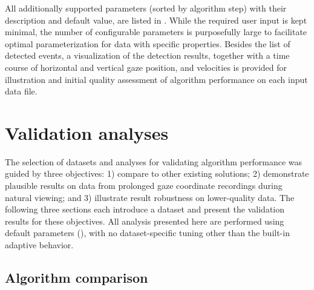 All additionally supported parameters (sorted by algorithm step) with their
description and default value, are listed in .
While the required user input is kept minimal, the number of configurable
parameters is purposefully large to facilitate optimal parameterization for
data with specific properties. Besides the list of detected events, a
visualization of the detection results, together with a time course of
horizontal and vertical gaze position, and velocities is provided for
illustration and initial quality assessment of algorithm performance on each
input data file.


\section*{Validation analyses}\label{ana}



The selection of datasets and analyses for validating algorithm performance was
guided by three objectives: 1) compare to other existing
solutions; 2) demonstrate plausible results on data from prolonged gaze
coordinate recordings during natural viewing; and 3) illustrate result
robustness on lower-quality data. The following three sections each introduce a
dataset and present the validation results for these objectives.  All analysis
presented here are performed using default parameters (), with
no dataset-specific tuning other than the built-in adaptive behavior.


\subsection*{Algorithm comparison}\label{ana_1}

